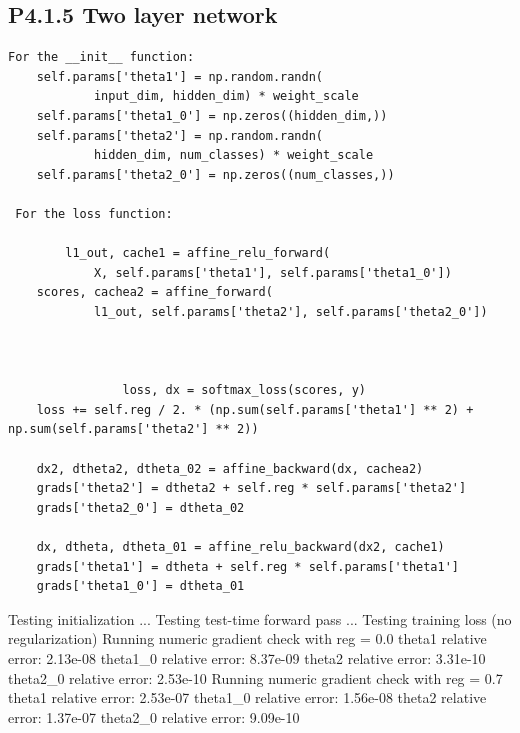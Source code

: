 \documentclass[12pt]{article}
\begin{document}
\subsection*{P4.1.5 Two layer network}
\begin{lstlisting}
For the __init__ function:
    self.params['theta1'] = np.random.randn(
            input_dim, hidden_dim) * weight_scale
    self.params['theta1_0'] = np.zeros((hidden_dim,))
    self.params['theta2'] = np.random.randn(
            hidden_dim, num_classes) * weight_scale
    self.params['theta2_0'] = np.zeros((num_classes,))
    
 For the loss function:      
    
        l1_out, cache1 = affine_relu_forward(
            X, self.params['theta1'], self.params['theta1_0'])
    scores, cachea2 = affine_forward(
            l1_out, self.params['theta2'], self.params['theta2_0'])
            
      
            
                loss, dx = softmax_loss(scores, y)
    loss += self.reg / 2. * (np.sum(self.params['theta1'] ** 2) + np.sum(self.params['theta2'] ** 2))

    dx2, dtheta2, dtheta_02 = affine_backward(dx, cachea2)
    grads['theta2'] = dtheta2 + self.reg * self.params['theta2']
    grads['theta2_0'] = dtheta_02

    dx, dtheta, dtheta_01 = affine_relu_backward(dx2, cache1)
    grads['theta1'] = dtheta + self.reg * self.params['theta1']
    grads['theta1_0'] = dtheta_01
\end{lstlisting}
Testing initialization ... 
Testing test-time forward pass ... 
Testing training loss (no regularization)
Running numeric gradient check with reg =  0.0
theta1 relative error: 2.13e-08
theta1\_0 relative error: 8.37e-09
theta2 relative error: 3.31e-10
theta2\_0 relative error: 2.53e-10
Running numeric gradient check with reg =  0.7
theta1 relative error: 2.53e-07
theta1\_0 relative error: 1.56e-08
theta2 relative error: 1.37e-07
theta2\_0 relative error: 9.09e-10
\end{document}
